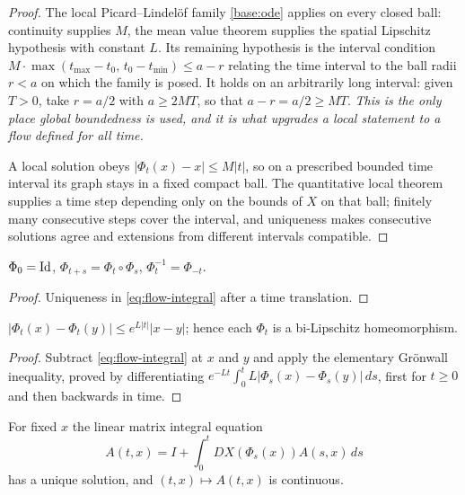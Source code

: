 \begin{proof}
The local Picard--Lindel\"of family \ref{base:ode} applies on every closed
ball: continuity supplies $M$, the mean value theorem supplies the spatial
Lipschitz hypothesis with constant $L$.  Its remaining hypothesis is the
interval condition
$M\cdot\max(t_{\max}-t_0,\,t_0-t_{\min})\le a-r$ relating the time interval to
the ball radii $r<a$ on which the family is posed.  It holds on an
arbitrarily long interval: given $T>0$, take $r=a/2$ with $a\ge2MT$, so that
$a-r=a/2\ge MT$.  \emph{This is the only place global boundedness is used, and
it is what upgrades a local statement to a flow defined for all time.}

A local solution obeys $|\Phi_t(x)-x|\le M|t|$, so on a prescribed bounded
time interval its graph stays in a fixed compact ball.  The quantitative local
theorem supplies a time step depending only on the bounds of $X$ on that ball;
finitely many consecutive steps cover the interval, and uniqueness makes
consecutive solutions agree and extensions from different intervals
compatible.
\end{proof}

\begin{lemma}\label{lem:flow-group}
$\Phi_0=\operatorname{Id}$, $\Phi_{t+s}=\Phi_t\circ\Phi_s$, $\Phi_t^{-1}=\Phi_{-t}$.
\end{lemma}

\begin{proof}
Uniqueness in \eqref{eq:flow-integral} after a time translation.
\end{proof}

\begin{lemma}\label{lem:flow-gronwall}
$|\Phi_t(x)-\Phi_t(y)|\le e^{L|t|}|x-y|$; hence each $\Phi_t$ is a
bi-Lipschitz homeomorphism.
\end{lemma}

\begin{proof}
Subtract \eqref{eq:flow-integral} at $x$ and $y$ and apply the elementary
Gr\"onwall inequality, proved by differentiating
$e^{-Lt}\int_0^tL|\Phi_s(x)-\Phi_s(y)|\,ds$, first for $t\ge0$ and then
backwards in time.
\end{proof}

\begin{lemma}\label{lem:flow-variational}
For fixed $x$ the linear matrix integral equation
\begin{equation}\label{eq:flow-variational}
  A(t,x)=I+\int_0^tDX(\Phi_s(x))A(s,x)\,ds
\end{equation}
has a unique solution, and $(t,x)\mapsto A(t,x)$ is continuous.
\end{lemma}

